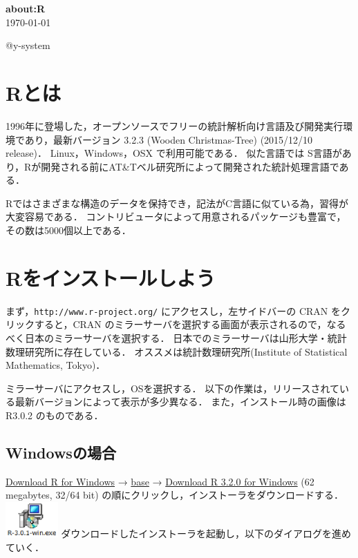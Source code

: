 \documentclass[a4paper,10pt,fleqn]{jarticle}
\begin{document}
\thispagestyle{empty}
\begin{center}
\vspace{3em}
{\bf \Huge{about:R}}
\vspace{1em}\\
\today
\end{center}
\begin{indentation}{2.5cm}{2.5cm}
\begin{screen}
\tableofcontents
\end{screen}
\end{indentation}
\begin{center}
@y-system
\end{center}
\newpage
{}
\section{Rとは}
1996年に登場した，オープンソースでフリーの統計解析向け言語及び開発実行環境であり，最新バージョン 3.2.3 (Wooden Christmas-Tree) (2015/12/10 release)．
Linux，Windows，OSX で利用可能である．
似た言語では S言語があり，Rが開発される前にAT\&Tベル研究所によって開発された統計処理言語である．

Rではさまざまな構造のデータを保持でき，記法がC言語に似ている為，習得が大変容易である．
コントリビュータによって用意されるパッケージも豊富で，その数は5000個以上である．

\section{Rをインストールしよう}
まず，{\tt http://www.r-project.org/} にアクセスし，左サイドバーの CRAN をクリックすると，CRAN のミラーサーバを選択する画面が表示されるので，なるべく日本のミラーサーバを選択する．
日本でのミラーサーバは山形大学・統計数理研究所に存在している．
オススメは統計数理研究所(Institute of Statistical Mathematics, Tokyo)．

ミラーサーバにアクセスし，OSを選択する．
以下の作業は，リリースされている最新バージョンによって表示が多少異なる．
また，インストール時の画像は R3.0.2 のものである．

\subsection{Windowsの場合}
\underline{Download R for Windows} → \underline{base} → \underline{Download R 3.2.0 for Windows} (62 megabytes, 32/64 bit) の順にクリックし，インストーラをダウンロードする．
\includegraphics[width=2cm]{img/windows/win001.eps} ダウンロードしたインストーラを起動し，以下のダイアログを進めていく．
\end{document}
